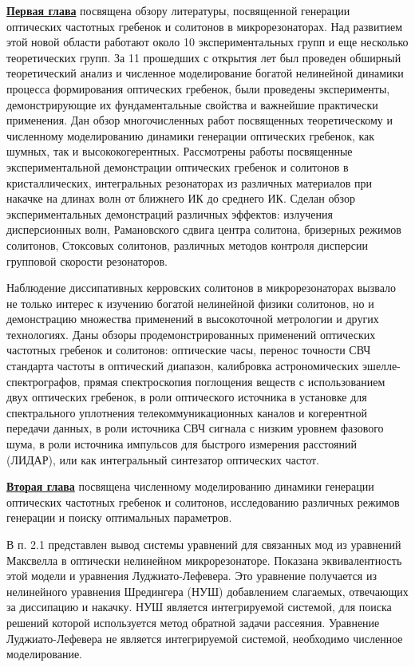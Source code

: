\underline{\textbf{Первая глава}} посвящена обзору литературы, посвященной генерации оптических частотных гребенок и солитонов в микрорезонаторах. Над развитием этой новой области работают около 10 экспериментальных групп и еще несколько теоретических групп. За 11 прошедших с открытия лет был проведен обширный теоретический анализ и численное моделирование богатой нелинейной динамики процесса формирования оптических гребенок, были проведены эксперименты, демонстрирующие их фундаментальные свойства и важнейшие практически применения. Дан обзор многочисленных работ посвященных теоретическому и численному моделированию динамики генерации оптических гребенок, как шумных, так и высококогерентных. Рассмотрены работы посвященные экспериментальной демонстрации оптических гребенок и солитонов в кристаллических, интегральных резонаторах из различных материалов при накачке на длинах волн от ближнего ИК до среднего ИК. Сделан обзор экспериментальных демонстраций различных эффектов: излучения дисперсионных волн, Рамановского сдвига центра солитона, бризерных режимов солитонов, Стоксовых солитонов, различных методов контроля дисперсии групповой скорости резонаторов.

Наблюдение диссипативных керровских солитонов в микрорезонаторах вызвало не только интерес к изучению богатой нелинейной физики солитонов, но и демонстрацию множества применений в высокоточной метрологии и других технологиях. Даны обзоры продемонстрированных применений оптических частотных гребенок и солитонов: оптические часы, перенос точности СВЧ стандарта частоты в оптический диапазон, калибровка астрономических эшелле-спектрографов, прямая спектроскопия поглощения веществ с использованием двух оптических гребенок, в роли оптического источника в установке для спектрального уплотнения телекоммуникационных каналов и когерентной передачи данных, в роли источника СВЧ сигнала с низким уровнем фазового шума, в роли источника импульсов для быстрого измерения расстояний (ЛИДАР), или как интегральный синтезатор оптических частот.

\underline{\textbf{Вторая глава}} посвящена численному моделированию динамики генерации оптических частотных гребенок и солитонов, исследованию различных режимов генерации и поиску оптимальных параметров.

В п. 2.1 представлен вывод системы уравнений для связанных мод из уравнений Максвелла в оптически нелинейном микрорезонаторе. Показана эквивалентность этой модели и уравнения Луджиато-Лефевера. Это уравнение получается из нелинейного уравнения Шредингера (НУШ) добавлением слагаемых, отвечающих за диссипацию и накачку. НУШ является интегрируемой системой, для поиска решений которой используется метод обратной задачи рассеяния. Уравнение Луджиато-Лефевера не является интегрируемой системой, необходимо численное моделирование.

